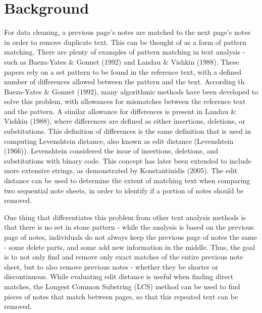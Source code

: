 \documentclass[print]{nuthesis}
\begin{document}
\hypertarget{background-1}{%
\section{Background}\label{background-1}}

For data cleaning, a previous page's notes are matched to the next page's notes in order to remove duplicate text.
This can be thought of as a form of pattern matching.
There are plenty of examples of pattern matching in text analysis - such as Baeza-Yates \& Gonnet (1992) and Landau \& Vishkin (1988).
These papers rely on a set pattern to be found in the reference text, with a defined number of differences allowed between the pattern and the text.
According th Baeza-Yates \& Gonnet (1992), many algorithmic methods have been developed to solve this problem, with allowances for mismatches between the reference text and the pattern.
A similar allowance for differences is present in Landau \& Vishkin (1988), where differences are defined as either insertions, deletions, or substitutions.
This definition of differences is the same definition that is used in computing Levenshtein distance, also known as edit distance (Levenshtein (1966)).
Levenshtein considered the issue of insertions, deletions, and substitutions with binary code.
This concept has later been extended to include more extensive strings, as demonstrated by Konstantinidis (2005).
The edit distance can be used to determine the extent of matching text when comparing two sequential note sheets, in order to identify if a portion of notes should be removed.

One thing that differentiates this problem from other text analysis methods is that there is no set in stone pattern - while the analysis is based on the previous page of notes, individuals do not always keep the previous page of notes the same - some delete parts, and some add new information in the middle.
Thus, the goal is to not only find and remove only exact matches of the entire previous note sheet, but to also remove previous notes - whether they be shorter or discontinuous.
While evaluating edit distance is useful when finding direct matches, the Longest Common Substring (LCS) method can be used to find pieces of notes that match between pages, so that this repeated text can be removed.
\end{document}
